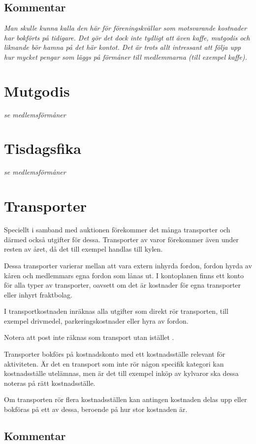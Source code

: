 				\begin{bokslut}
					
				\end{bokslut}
			
				\subsection{Kommentar}
				\emph{Man skulle kunna kalla den här för \emph{föreningskvällar} som motsvarande kostnader har bokförts på tidigare. Det gör det dock inte tydligt att även kaffe, mutgodis och liknande bör hamna på det här kontot. Det är trots allt intressant att följa upp hur mycket pengar som läggs på förmåner till medlemmarna (till exempel kaffe).}
			
				\section{Mutgodis}
				\emph{se medlemsförmåner}
			
				\section{Tisdagsfika}
				\emph{se medlemsförmåner}
			
				\section{Transporter}
				
				Speciellt i samband med auktionen förekommer det många transporter och därmed också utgifter för dessa. Transporter av varor förekommer även under resten av året, då det till exempel handlas till kylen.
		
		Dessa transporter varierar mellan att vara extern inhyrda fordon, fordon hyrda av kåren och medlemmars egna fordon som lånas ut. I kontoplanen finns ett konto för alla typer av transporter, oavsett om det är kostnader för egna transporter eller inhyrt fraktbolag.
		
		I transportkostnaden inräknas alla utgifter som direkt rör transporten, till exempel drivmedel, parkeringskostnader eller hyra av fordon.
		
		Notera att post inte räknas som transport utan istället .
		
			
				\begin{redovisning}
					Transporter bokförs på kostnadskonto  med ett kostnadsställe relevant för aktiviteten. Är det en transport som inte rör någon specifik kategori kan kostnadsställe utelämnas, men är det till exempel inköp av kylvaror ska dessa noteras på rätt kostnadsställe.
		
		Om transporten rör flera kostnadsställen kan antingen kostnaden delas upp eller bokföras på ett av dessa, beroende på hur stor kostnaden är.
				\end{redovisning}
			
				\begin{bokslut}
					
				\end{bokslut}
			
				\subsection{Kommentar}
				\emph{}
			
